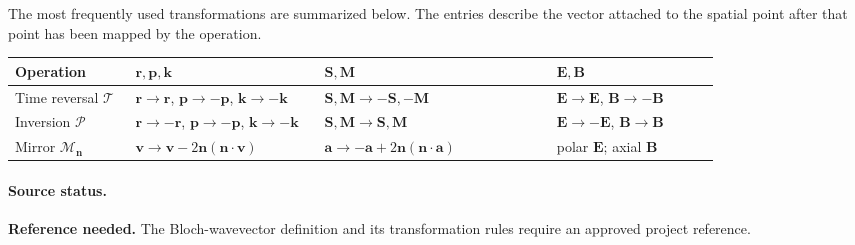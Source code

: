 The most frequently used transformations are summarized below.  The entries
describe the vector attached to the spatial point after that point has been
mapped by the operation.
\begin{center}
    \renewcommand{\arraystretch}{1.25}
    \small
    \begin{tabular}{|p{0.14\linewidth}|p{0.22\linewidth}|p{0.27\linewidth}|p{0.19\linewidth}|}
        \hline
        Operation                                                         & $\mathbf{r},\mathbf{p},\mathbf{k}$ & $\mathbf{S},\mathbf{M}$ &
        $\mathbf{E},\mathbf{B}$                                                                                                 \\
        \hline
        Time reversal $\mathcal{T}$                                       &
        $\mathbf{r}\to\mathbf{r}$, $\mathbf{p}\to-\mathbf{p}$,
        $\mathbf{k}\to-\mathbf{k}$                                       &
        $\mathbf{S},\mathbf{M}\to-\mathbf{S},-\mathbf{M}$                 &
        $\mathbf{E}\to\mathbf{E}$, $\mathbf{B}\to-\mathbf{B}$                                                                   \\
        \hline
        Inversion $\mathcal{P}$                                           &
        $\mathbf{r}\to-\mathbf{r}$, $\mathbf{p}\to-\mathbf{p}$,
        $\mathbf{k}\to-\mathbf{k}$                                       &
        $\mathbf{S},\mathbf{M}\to\mathbf{S},\mathbf{M}$                   &
        $\mathbf{E}\to-\mathbf{E}$, $\mathbf{B}\to\mathbf{B}$                                                                   \\
        \hline
        Mirror $\mathcal{M}_{\mathbf{n}}$                                 &
        $\mathbf{v}\to\mathbf{v}-2\mathbf{n}(\mathbf{n}\cdot\mathbf{v})$  &
        $\mathbf{a}\to-\mathbf{a}+2\mathbf{n}(\mathbf{n}\cdot\mathbf{a})$ &
        polar $\mathbf{E}$; axial $\mathbf{B}$                                                                                  \\
        \hline
    \end{tabular}
\end{center}

\paragraph{Source status.}
\textbf{Reference needed.}  The Bloch-wavevector definition and its
transformation rules require an approved project reference.

